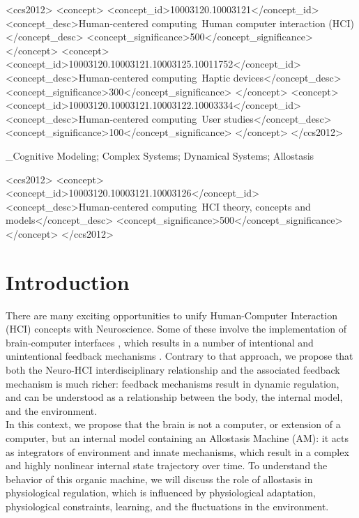 \documentclass{sigchi}
\begin{document}

\begin{CCSXML}
<ccs2012>
<concept>
<concept_id>10003120.10003121</concept_id>
<concept_desc>Human-centered computing~Human computer interaction (HCI)</concept_desc>
<concept_significance>500</concept_significance>
</concept>
<concept>
<concept_id>10003120.10003121.10003125.10011752</concept_id>
<concept_desc>Human-centered computing~Haptic devices</concept_desc>
<concept_significance>300</concept_significance>
</concept>
<concept>
<concept_id>10003120.10003121.10003122.10003334</concept_id>
<concept_desc>Human-centered computing~User studies</concept_desc>
<concept_significance>100</concept_significance>
</concept>
</ccs2012>
\end{CCSXML}


\keywords  _Cognitive Modeling; Complex Systems; Dynamical Systems; Allostasis

\printccsdesc
\begin{CCSXML}
<ccs2012>
   <concept>
       <concept_id>10003120.10003121.10003126</concept_id>
       <concept_desc>Human-centered computing~HCI theory, concepts and models</concept_desc>
       <concept_significance>500</concept_significance>
       </concept>
 </ccs2012>
\end{CCSXML}

\section{Introduction}

There are many exciting opportunities to unify Human-Computer Interaction (HCI) concepts with Neuroscience. Some of these involve the implementation of brain-computer interfaces \cite{zander}, which results in a number of intentional and unintentional feedback mechanisms \cite{ritter}. Contrary to that approach, we propose that both the Neuro-HCI interdisciplinary relationship and the associated feedback mechanism is much richer: feedback mechanisms result in dynamic regulation, and can be understood as a relationship between the body, the internal model, and the environment.\\
In this context, we propose that the brain is not a computer, or extension of a computer, but an internal model containing an Allostasis Machine (AM): it acts as integrators of environment and innate mechanisms, which result in a complex and highly nonlinear internal state trajectory over time. To understand the behavior of this organic machine, we will discuss the role of allostasis in physiological regulation, which is influenced by physiological adaptation, physiological constraints, learning, and the fluctuations in the environment.
\end{document}
